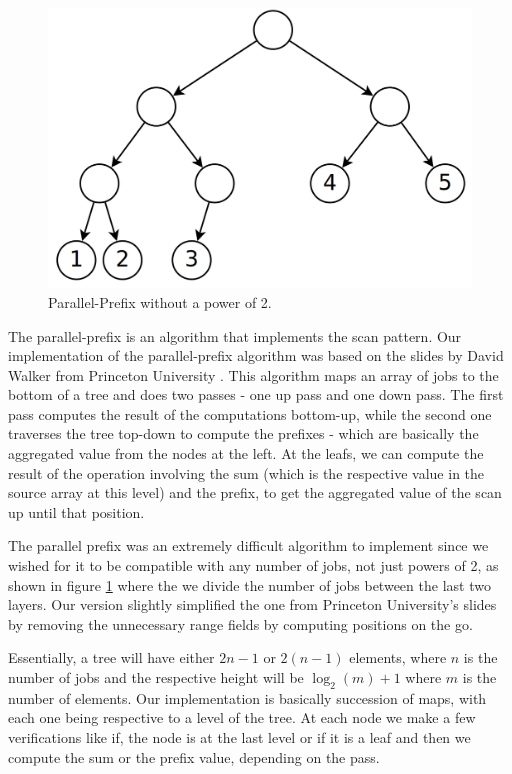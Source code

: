 \documentclass[10pt,journal]{IEEEtran}
\begin{document}
\begin{figure}[htbp]
	\centerline{\includegraphics[scale=0.15]{img/parprefix.png}}
	\caption{ Parallel-Prefix without a power of 2. }
	\label{parprefix}
\end{figure}

The parallel-prefix is an algorithm that implements the scan pattern. Our implementation of the parallel-prefix algorithm was based on the slides by David Walker from Princeton University \cite{parprefix}. This algorithm maps an array of jobs to the bottom of a tree and does two passes - one up pass and one down pass. The first pass computes the result of the computations bottom-up, while the second one traverses the tree top-down to compute the prefixes - which are basically the aggregated value from the nodes at the left. At the leafs, we can compute the result of the operation involving the sum (which is the respective value in the source array at this level) and the prefix, to get the aggregated value of the scan up until that position.

The parallel prefix was an extremely difficult algorithm to implement since we wished for it to be compatible with any number of jobs, not just powers of 2, as shown in figure \ref{parprefix} where the we divide the number of jobs between the last two layers. Our version slightly simplified the one from Princeton University's slides \cite{parprefix} by removing the unnecessary range fields by computing positions on the go.

Essentially, a tree will have either $ 2n - 1 $ or $ 2(n - 1) $ elements, where $ n $ is the number of jobs and the respective height will be $ \log_2(m) + 1 $ where $ m $ is the number of elements. Our implementation is basically succession of maps, with each one being respective to a level of the tree. At each node we make a few verifications like if, the node is at the last level or if it is a leaf and then we compute the sum or the prefix value, depending on the pass. 
\end{document}
